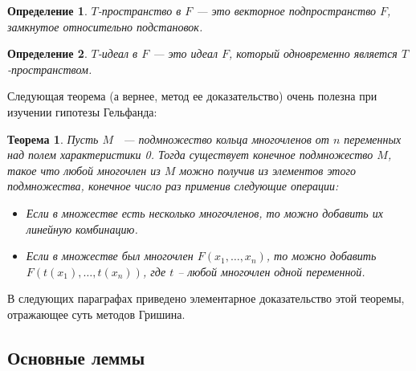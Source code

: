 \documentclass[12pt,a4paper]{article}
\newtheorem{definition}{Определение}[section]
\newtheorem{theorem}{Теорема}[section]
\begin{document}
    \vskip 0.1in\noindent
    \begin{definition}
        $T$-пространство в $F$ — это векторное подпространство $F$, замкнутое относительно подстановок.
    \end{definition}
    \vskip 0.1in\noindent

    \vskip 0.1in\noindent
    \begin{definition}
        $T$-идеал в $F$ — это идеал $F$, который одновременно является $T$-пространством.
    \end{definition}
    \vskip 0.1in\noindent

    Следующая теорема (а вернее, метод ее доказательство) очень полезна при изучении гипотезы Гельфанда:
    \vskip 0.1in\noindent
    \begin{theorem}
        \label{main}
        Пусть $M$ ~--- подмножество кольца многочленов от $n$ переменных над полем характеристики 0.
        Тогда существует конечное подмножество $M$, такое что любой многочлен из $M$ можно получив из элементов этого подмножества, конечное число раз применив следующие операции:
        \begin{itemize}
            \item Если в множестве есть несколько многочленов, то можно добавить их линейную комбинацию.
            \item Если в множестве был многочлен $F(x_1,\ldots,x_n)$, то можно добавить $F(t(x_1),\ldots,t(x_n))$, где $t$ -- любой многочлен одной переменной.
        \end{itemize}
    \end{theorem}
    \vskip 0.1in\noindent
    В следующих параграфах приведено элементарное доказательство этой теоремы, отражающее суть методов Гришина.

    \subsection{Основные леммы}
\end{document}
